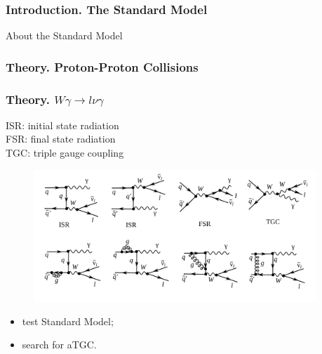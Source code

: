 \begin{frame}\frametitle{Introduction. The Standard Model}
\scriptsize
About the Standard Model
\end{frame}%

\begin{frame}\frametitle{Theory. Proton-Proton Collisions}
\end{frame}%

\begin{frame}\frametitle{Theory. $W\gamma\rightarrow l\nu\gamma$}

\scriptsize
ISR: initial state radiation\\
FSR: final state radiation\\
TGC: triple gauge coupling

   \begin{figure}[htb]
      \begin{center}
        \scriptsize
          \includegraphics[width=0.95\textwidth]{../figs/WgAbout/feynmWg_LO_NLO.png}
       \end{center}
    \end{figure}

  \begin{itemize}
    \scriptsize
    \item test Standard Model;
    \item search for aTGC.
  \end{itemize}
\end{frame}%
